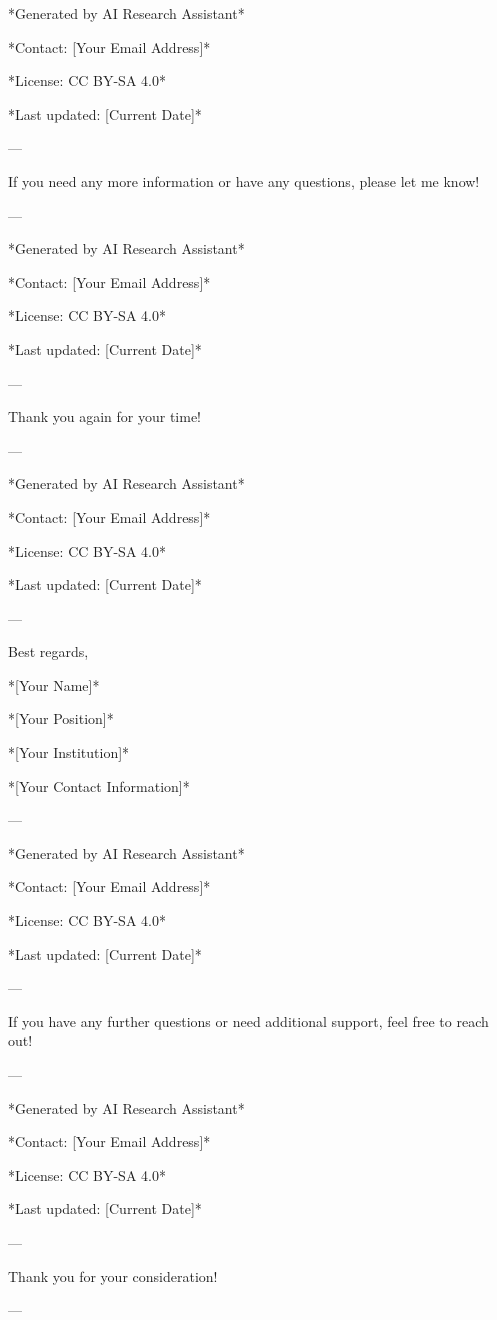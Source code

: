 *Generated by AI Research Assistant* 

*Contact: [Your Email Address]* 

*License: CC BY-SA 4.0* 

*Last updated: [Current Date]* 

--- 

If you need any more information or have any questions, please let me know! 

--- 

*Generated by AI Research Assistant* 

*Contact: [Your Email Address]* 

*License: CC BY-SA 4.0* 

*Last updated: [Current Date]* 

--- 

Thank you again for your time! 

--- 

*Generated by AI Research Assistant* 

*Contact: [Your Email Address]* 

*License: CC BY-SA 4.0* 

*Last updated: [Current Date]* 

--- 

Best regards, 

*[Your Name]* 

*[Your Position]* 

*[Your Institution]* 

*[Your Contact Information]* 

--- 

*Generated by AI Research Assistant* 

*Contact: [Your Email Address]* 

*License: CC BY-SA 4.0* 

*Last updated: [Current Date]* 

--- 

If you have any further questions or need additional support, feel free to reach out! 

--- 

*Generated by AI Research Assistant* 

*Contact: [Your Email Address]* 

*License: CC BY-SA 4.0* 

*Last updated: [Current Date]* 

--- 

Thank you for your consideration! 

--- 

